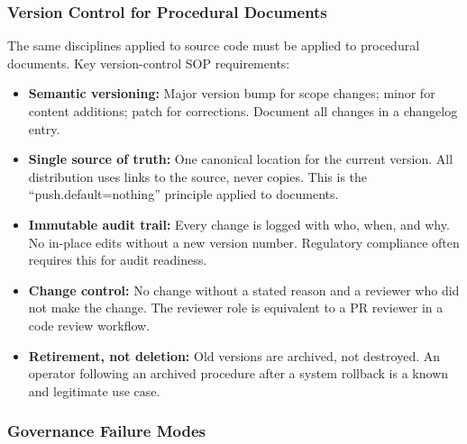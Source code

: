 \documentclass[11pt,letterpaper]{article}
\begin{document}
\subsubsection{Version Control for Procedural Documents}

The same disciplines applied to source code must be applied to procedural documents. Key version-control SOP requirements:

\begin{itemize}[leftmargin=1.5em]
  \item \textbf{Semantic versioning:} Major version bump for scope changes; minor for content additions; patch for corrections. Document all changes in a changelog entry.
  \item \textbf{Single source of truth:} One canonical location for the current version. All distribution uses links to the source, never copies. This is the ``push.default=nothing'' principle applied to documents.
  \item \textbf{Immutable audit trail:} Every change is logged with who, when, and why. No in-place edits without a new version number. Regulatory compliance often requires this for audit readiness.
  \item \textbf{Change control:} No change without a stated reason and a reviewer who did not make the change. The reviewer role is equivalent to a PR reviewer in a code review workflow.
  \item \textbf{Retirement, not deletion:} Old versions are archived, not destroyed. An operator following an archived procedure after a system rollback is a known and legitimate use case.
\end{itemize}

\subsubsection{Governance Failure Modes}
\end{document}
